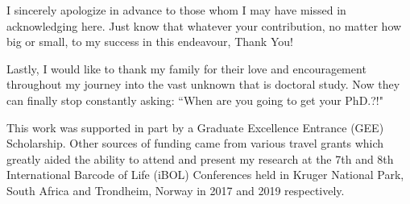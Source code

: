 \begin{acknowledgements}
\noindent I sincerely apologize in advance to those whom I may have missed in acknowledging here. Just know that whatever your contribution, no matter how big or small, to my success in this endeavour, Thank You!

\vspace{5mm}

\noindent Lastly, I would like to thank my family for their love and encouragement throughout my journey into the vast unknown that is doctoral study. Now they can finally stop constantly asking: ``When are you going to get your PhD.?!"

\vspace{5mm}

\noindent This work was supported in part by a Graduate Excellence Entrance (GEE) \\ Scholarship. Other sources of funding came from various travel grants which greatly aided the ability to attend and present my research at the 7th and 8th International Barcode of Life (iBOL) Conferences held in Kruger National Park, South Africa and Trondheim, Norway in 2017 and 2019 respectively.


\end{acknowledgements}
\dsp
